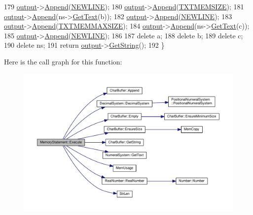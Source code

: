 \begin{DoxyCode}
179     \hyperlink{classSyntaxNode_a1180628cbe3fce43930cee0df5a9ce5c}{output}->\hyperlink{classCharBuffer_a045b38735f7b3007c1b98d3d7b7feafe}{Append}(\hyperlink{platform_8h_a806511f4930171733227c99101dc0606}{NEWLINE});
180     \hyperlink{classSyntaxNode_a1180628cbe3fce43930cee0df5a9ce5c}{output}->\hyperlink{classCharBuffer_a045b38735f7b3007c1b98d3d7b7feafe}{Append}(\hyperlink{text_8h_a6664fc01484a43ab07ff5c7ec761a637}{TXTMEMSIZE});
181     \hyperlink{classSyntaxNode_a1180628cbe3fce43930cee0df5a9ce5c}{output}->\hyperlink{classCharBuffer_a045b38735f7b3007c1b98d3d7b7feafe}{Append}(ns->\hyperlink{classNumeralSystem_a74dc91c4dbab4a88a123b2a32753f485}{GetText}(b));
182     \hyperlink{classSyntaxNode_a1180628cbe3fce43930cee0df5a9ce5c}{output}->\hyperlink{classCharBuffer_a045b38735f7b3007c1b98d3d7b7feafe}{Append}(\hyperlink{platform_8h_a806511f4930171733227c99101dc0606}{NEWLINE});
183     \hyperlink{classSyntaxNode_a1180628cbe3fce43930cee0df5a9ce5c}{output}->\hyperlink{classCharBuffer_a045b38735f7b3007c1b98d3d7b7feafe}{Append}(\hyperlink{text_8h_a9351a4edb0e5a7d13b78c016e5a964c4}{TXTMEMMAXSIZE});
184     \hyperlink{classSyntaxNode_a1180628cbe3fce43930cee0df5a9ce5c}{output}->\hyperlink{classCharBuffer_a045b38735f7b3007c1b98d3d7b7feafe}{Append}(ns->\hyperlink{classNumeralSystem_a74dc91c4dbab4a88a123b2a32753f485}{GetText}(c));
185     \hyperlink{classSyntaxNode_a1180628cbe3fce43930cee0df5a9ce5c}{output}->\hyperlink{classCharBuffer_a045b38735f7b3007c1b98d3d7b7feafe}{Append}(\hyperlink{platform_8h_a806511f4930171733227c99101dc0606}{NEWLINE});
186 
187     \textcolor{keyword}{delete} a;
188     \textcolor{keyword}{delete} b;
189     \textcolor{keyword}{delete} c;
190     \textcolor{keyword}{delete} ns;
191     \textcolor{keywordflow}{return} \hyperlink{classSyntaxNode_a1180628cbe3fce43930cee0df5a9ce5c}{output}->\hyperlink{classCharBuffer_a7dfd3feaaf80f318ba44efe15b1ec44b}{GetString}();
192 \}
\end{DoxyCode}


Here is the call graph for this function\+:
\nopagebreak
\begin{figure}[H]
\begin{center}
\leavevmode
\includegraphics[width=350pt]{d9/dd1/classMemoryStatement_a0cfd7aae34f2103c7734980907426f4e_cgraph}
\end{center}
\end{figure}





